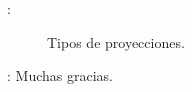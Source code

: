 \begin{frame}{\secname : \subsecname}
  \begin{figure}
    \centering
    \caption{Tipos de proyecciones.}
    \label{}
  \end{figure}
\end{frame}



\begin{frame}{\secname : \subsecname}
Muchas gracias.
\end{frame}
